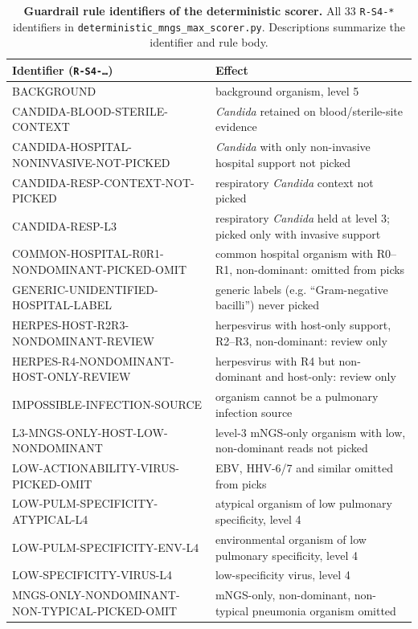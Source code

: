 \documentclass[11pt,a4paper]{article}
\newcommand{\mngs}{mNGS\xspace}
\begin{document}
\begin{table}[h]
\centering
\caption{\textbf{Guardrail rule identifiers of the deterministic scorer.} All 33 \texttt{R-S4-*} identifiers in \texttt{deterministic\_mngs\_max\_scorer.py}. Descriptions summarize the identifier and rule body.}
\label{tab:s3}
\footnotesize
\begin{tabular}{p{7.0cm}p{8.0cm}}
\toprule
Identifier (\texttt{R-S4-\ldots}) & Effect \\
\midrule
BACKGROUND & background organism, level 5 \\
CANDIDA-BLOOD-STERILE-CONTEXT & \textit{Candida} retained on blood/sterile-site evidence \\
CANDIDA-HOSPITAL-NONINVASIVE-NOT-PICKED & \textit{Candida} with only non-invasive hospital support not picked \\
CANDIDA-RESP-CONTEXT-NOT-PICKED & respiratory \textit{Candida} context not picked \\
CANDIDA-RESP-L3 & respiratory \textit{Candida} held at level 3; picked only with invasive support \\
COMMON-HOSPITAL-R0R1-NONDOMINANT-PICKED-OMIT & common hospital organism with R0--R1, non-dominant: omitted from picks \\
GENERIC-UNIDENTIFIED-HOSPITAL-LABEL & generic labels (e.g. ``Gram-negative bacilli'') never picked \\
HERPES-HOST-R2R3-NONDOMINANT-REVIEW & herpesvirus with host-only support, R2--R3, non-dominant: review only \\
HERPES-R4-NONDOMINANT-HOST-ONLY-REVIEW & herpesvirus with R4 but non-dominant and host-only: review only \\
IMPOSSIBLE-INFECTION-SOURCE & organism cannot be a pulmonary infection source \\
L3-MNGS-ONLY-HOST-LOW-NONDOMINANT & level-3 \mngs-only organism with low, non-dominant reads not picked \\
LOW-ACTIONABILITY-VIRUS-PICKED-OMIT & EBV, HHV-6/7 and similar omitted from picks \\
LOW-PULM-SPECIFICITY-ATYPICAL-L4 & atypical organism of low pulmonary specificity, level 4 \\
LOW-PULM-SPECIFICITY-ENV-L4 & environmental organism of low pulmonary specificity, level 4 \\
LOW-SPECIFICITY-VIRUS-L4 & low-specificity virus, level 4 \\
MNGS-ONLY-NONDOMINANT-NON-TYPICAL-PICKED-OMIT & \mngs-only, non-dominant, non-typical pneumonia organism omitted \\

\end{tabular}
\end{table}
\end{document}
